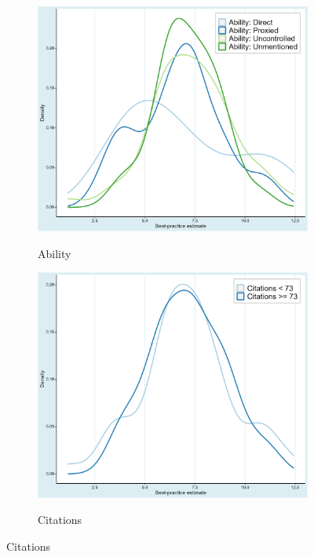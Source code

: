 \begin{figure}[!htbp]
\begin{center}
\begin{subfigure}[!htbp]{0.38\textwidth}
   \vspace{0.2cm}
   \caption{Ability}
   \vspace{-0.1cm}
   \includegraphics[width=0.95\linewidth]{Figures/BPE/bpe_ability.png}
   \label{fig:bpe_ability}
\end{subfigure}
\begin{subfigure}[!htbp]{0.38\textwidth}
   \vspace{0.2cm}
   \caption{Citations}
   \vspace{-0.1cm}
   \includegraphics[width=0.95\linewidth]{Figures/BPE/bpe_citations.png}
   \label{fig:bpe_citations}
\end{subfigure}


\end{center}
\end{figure}
